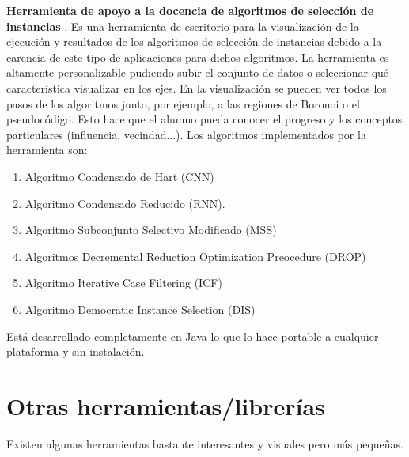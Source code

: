 \textbf{Herramienta de apoyo a la docencia de algoritmos de selección de instancias}
\cite{arnaiz2012herramienta}. Es una herramienta de escritorio para la
visualización de la ejecución y resultados de los algoritmos de selección de
instancias debido a la carencia de este tipo de aplicaciones para dichos
algoritmos. La herramienta es altamente personalizable pudiendo subir el
conjunto de datos o seleccionar qué característica visualizar en los ejes. En la
visualización se pueden ver todos los pasos de los algoritmos junto, por
ejemplo, a las regiones de Boronoi o el pseudocódigo. Esto hace que el alumno
pueda conocer el progreso y los conceptos particulares (influencia, vecindad...). Los
algoritmos implementados por la herramienta son:
\begin{enumerate}
    \item Algoritmo Condensado de Hart (CNN)
    \item Algoritmo Condensado Reducido (RNN).
    \item Algoritmo Subconjunto Selectivo Modificado (MSS)
    \item Algoritmos Decremental Reduction Optimization Preocedure (DROP)
    \item Algoritmo Iterative Case Filtering (ICF)
    \item Algoritmo Democratic Instance Selection (DIS)
\end{enumerate}
Está desarrollado completamente en Java lo que lo hace portable a cualquier
plataforma y sin instalación.

\section{Otras herramientas/librerías}
Existen algunas herramientas bastante interesantes y visuales pero más pequeñas.


